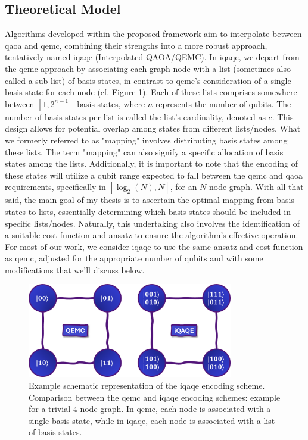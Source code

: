 \subsection{Theoretical Model}
\label{subsection:iQAQE Theoretical Framework}
Algorithms developed within the proposed framework aim to interpolate between \acrshort{qaoa} and \acrshort{qemc}, combining their strengths into a more robust approach, tentatively named \acrshort{iqaqe} (Interpolated QAOA/QEMC). In \acrshort{iqaqe}, we depart from the \acrshort{qemc} approach by associating each graph node with a list (sometimes also called a sub-list) of basis states, in contrast to \acrshort{qemc}'s consideration of a single basis state for each node (cf. Figure \ref{fig:iQAQE_Encoding}). Each of these lists comprises somewhere between $\left[1, 2^{n-1}\right]$ basis states, where $n$ represents the number of qubits. The number of basis states per list is called the list's cardinality, denoted as $c$. This design allows for potential overlap among states from different lists/nodes. What we formerly referred to as "mapping" involves distributing basis states among these lists. The term "mapping" can also signify a specific allocation of basis states among the lists. Additionally, it is important to note that the encoding of these states will utilize a qubit range expected to fall between the \acrshort{qemc} and \acrshort{qaoa} requirements, specifically in $[\log_2(N), N]$, for an $N$-node graph. With all that said, the main goal of my thesis is to ascertain the optimal mapping from basis states to lists, essentially determining which basis states should be included in specific lists/nodes. Naturally, this undertaking also involves the identification of a suitable cost function and ansatz to ensure the algorithm's effective operation. For most of our work, we consider \acrshort{iqaqe} to use the same ansatz and cost function as \acrshort{qemc}, adjusted for the appropriate number of qubits and with some modifications that we'll discuss below.

\begin{figure}[H]
    \centering
    \includegraphics[width=0.8\textwidth]{Figures/Diagrams/QEMC_iQAQE_Encodings.png}
    \caption{Example schematic representation of the \acrshort{iqaqe} encoding scheme. Comparison between the \acrshort{qemc} and \acrshort{iqaqe} encoding schemes: example for a trivial $4$-node graph. In \acrshort{qemc}, each node is associated with a single basis state, while in \acrshort{iqaqe}, each node is associated with a list of basis states.}
\label{fig:iQAQE_Encoding}
\end{figure}

